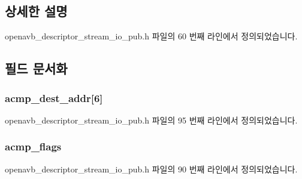 \subsection{상세한 설명}


openavb\+\_\+descriptor\+\_\+stream\+\_\+io\+\_\+pub.\+h 파일의 60 번째 라인에서 정의되었습니다.



\subsection{필드 문서화}
\subsubsection[{\texorpdfstring{acmp\+\_\+dest\+\_\+addr}{acmp_dest_addr}}]{ acmp\+\_\+dest\+\_\+addr\mbox{[}6\mbox{]}}\hypertarget{structopenavb__aem__descriptor__stream__io__t_a34430b0f08246fa8026b9c6c310eb33b}{}\label{structopenavb__aem__descriptor__stream__io__t_a34430b0f08246fa8026b9c6c310eb33b}


openavb\+\_\+descriptor\+\_\+stream\+\_\+io\+\_\+pub.\+h 파일의 95 번째 라인에서 정의되었습니다.

\subsubsection[{\texorpdfstring{acmp\+\_\+flags}{acmp_flags}}]{ acmp\+\_\+flags}\hypertarget{structopenavb__aem__descriptor__stream__io__t_afe3bda8022a2df033f4cf61858a8a016}{}\label{structopenavb__aem__descriptor__stream__io__t_afe3bda8022a2df033f4cf61858a8a016}


openavb\+\_\+descriptor\+\_\+stream\+\_\+io\+\_\+pub.\+h 파일의 90 번째 라인에서 정의되었습니다.


